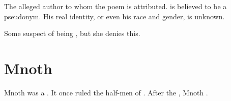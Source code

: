 \section[Melcryth]{\Melcryth}
The alleged author to whom the poem \emph{} is attributed. 
\quo{\Melcryth} is believed to be a pseudonym. 
His real identity, or even his race and gender, is unknown. 

Some suspect  of being \Melcryth, but she denies this. 















\section{Mnoth}
Mnoth was a . 
It once ruled the half-men of .
After the , Mnoth .































